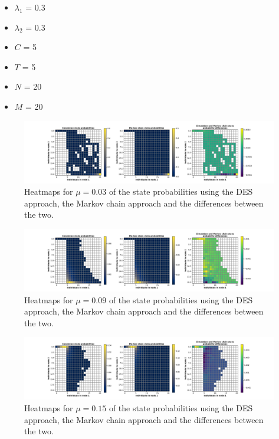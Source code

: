 \begin{multicols}{2}
    \begin{itemize}
        \item \(\lambda_1\) = 0.3
        \item \(\lambda_2\) = 0.3
        \item \(C\) = 5
        \item \(T\) = 5
        \item \(N\) = 20
        \item \(M\) = 20
    \end{itemize}
\end{multicols}


\begin{figure}[H]
    \includegraphics[width=\textwidth, trim=100 10 100 10, clip]{chapters/03_queueing_model/Bin/numeric_results_and_timings/steady_state_probabilities/main_1.pdf}
    \caption{Heatmaps for \(\mu = 0.03\) of the state probabilities using the
    DES approach, the Markov chain approach and the differences between the
    two.}
    \label{fig:comparison_steady_state_probabilities_1}
\end{figure}

\begin{figure}[H]
    \includegraphics[width=\textwidth, trim=100 10 100 10, clip]{chapters/03_queueing_model/Bin/numeric_results_and_timings/steady_state_probabilities/main_3.pdf}
    \caption{Heatmaps for \(\mu = 0.09\) of the state probabilities using the
    DES approach, the Markov chain approach and the differences between the
    two.}
    \label{fig:comparison_steady_state_probabilities_2}
\end{figure}

\begin{figure}[H]
    \includegraphics[width=\textwidth, trim=100 10 100 10, clip]{chapters/03_queueing_model/Bin/numeric_results_and_timings/steady_state_probabilities/main_5.pdf}
    \caption{Heatmaps for \(\mu = 0.15\) of the state probabilities using the
    DES approach, the Markov chain approach and the differences between the
    two.}
    \label{fig:comparison_steady_state_probabilities_3}
\end{figure}

